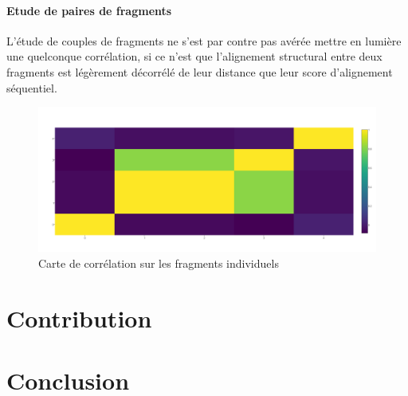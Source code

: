 \documentclass[a4paper, journal, 11pt, onecolumn]{IEEEtran}
\begin{document}
\paragraph{Etude de paires de fragments}

L'étude de couples de fragments ne s'est par contre pas avérée mettre en lumière
une quelconque corrélation, si ce n'est que l'alignement structural entre deux
fragments est légèrement décorrélé de leur distance que leur score d'alignement
séquentiel.

\begin{figure}
  \centering
  \includegraphics[scale=0.3]{PairOneRecHeat}
  \caption{Carte de corrélation sur les fragments individuels}
\end{figure}

\section{Contribution}



\section*{Conclusion}

\printbibliography
\end{document}
